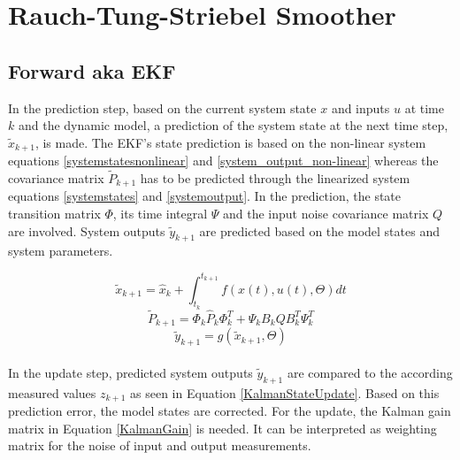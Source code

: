 \documentclass[%
	pdftex,
	12pt,								%
	parskip=half,				%
	headheight = 12pt,	%
	headsepline,				%
	footsepline,				%
	footheight = 16pt,	%
	DIV=calc,						%
	BCOR=8mm,						%
	headinclude=false,	%
	footinclude=false,	%
]{scrreprt}						%
\begin{document}
\chapter{Rauch-Tung-Striebel Smoother}
\section{Forward aka EKF}
In the prediction step, based on the current system state $x$ and inputs $u$ at time $k$ and the dynamic model, a prediction of the system state at the next time step, $\widetilde{x}_{k+1}$, is made. The EKF's state prediction is based on the non-linear system equations  \ref{systemstatesnonlinear} and \ref{system_output_non-linear} whereas the covariance matrix $\widetilde{P} _{k+1}$ has to be predicted through the linearized system equations  \ref{systemstates} and \ref{systemoutput}. In the prediction, the state transition matrix $\Phi$, its time integral $\Psi$ and the input noise covariance matrix $Q$ are involved. System outputs $\widetilde{y}_{k+1}$ are predicted based on the model states and system parameters.

\begin{equation}
\widetilde{x} _{k+1} = \widehat{x} _{k} + \int_{t_{k}}^{t_{k+1}} f(x(t), u(t), \Theta)dt \label{KalmanStatePrediction}
\end{equation}
\begin{equation}
\widetilde{P} _{k+1} = \Phi_{k} \widehat{P}_k\Phi_{k}^T + \Psi_{k}B_{k}QB_{k}^T\Psi_{k}^T
\label{CovariancePrediction}
\end{equation}
\begin{equation}
\widetilde{y}_{k+1}= g(\widetilde{x} _{k+1},\Theta) \label{SystemOutputsKalman}
\end{equation}\\
In the update step, predicted system outputs $\widetilde{y}_{k+1}$ are compared to the according measured values $z_{k+1}$ as seen in Equation \ref{KalmanStateUpdate}. Based on this prediction error, the model states are corrected. For the update, the Kalman gain matrix in Equation \ref{KalmanGain} is needed. It can be interpreted as weighting matrix for the noise of input and output measurements. 
\end{document}
